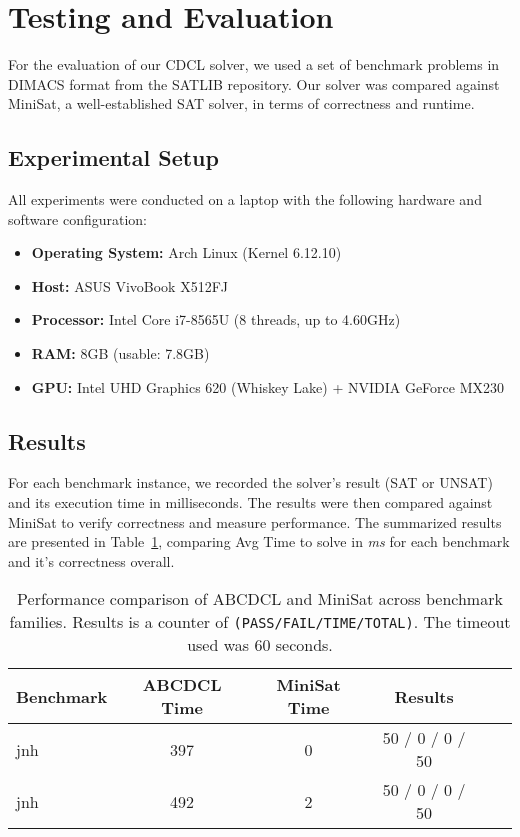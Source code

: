 \documentclass[a4paper,12pt]{article}
\begin{document}
\section{Testing and Evaluation}

For the evaluation of our CDCL solver, we used a set of benchmark problems in DIMACS
format from the SATLIB repository. Our solver was compared against MiniSat, a
well-established SAT solver, in terms of correctness and runtime.

\subsection{Experimental Setup}
All experiments were conducted on a laptop with the following hardware and software configuration:

\begin{itemize}
    \item \textbf{Operating System:} Arch Linux (Kernel 6.12.10)
    \item \textbf{Host:} ASUS VivoBook X512FJ
    \item \textbf{Processor:} Intel Core i7-8565U (8 threads, up to 4.60GHz)
    \item \textbf{RAM:} 8GB (usable: 7.8GB)
    \item \textbf{GPU:} Intel UHD Graphics 620 (Whiskey Lake) + NVIDIA GeForce MX230
\end{itemize}

\subsection{Results}
For each benchmark instance, we recorded the solver’s result (SAT or UNSAT) and its
execution time in milliseconds. The results were then compared against MiniSat to
verify correctness and measure performance. The summarized results are presented in
Table~\ref{tab:results}, comparing Avg Time to solve in \textit{ms} for each benchmark
and it's correctness overall.

\begin{table}[h]
    \centering
    \begin{tabular}{|l|c|c|c|c|c|}
        \hline
        \textbf{Benchmark} & \textbf{ABCDCL Time} & \textbf{MiniSat Time} & \textbf{Results } \\
        \hline
        jnh                & 397                  & 0                     & 50 / 0 / 0 / 50   \\
        jnh                & 492                  & 2                     & 50 / 0 / 0 / 50   \\

        \hline
    \end{tabular}
    \caption{Performance comparison of ABCDCL and MiniSat across benchmark families. Results is a
        counter of \texttt{(PASS/FAIL/TIME/TOTAL)}. The timeout used was $60$ seconds.}
    \label{tab:results}
\end{table}
\end{document}
